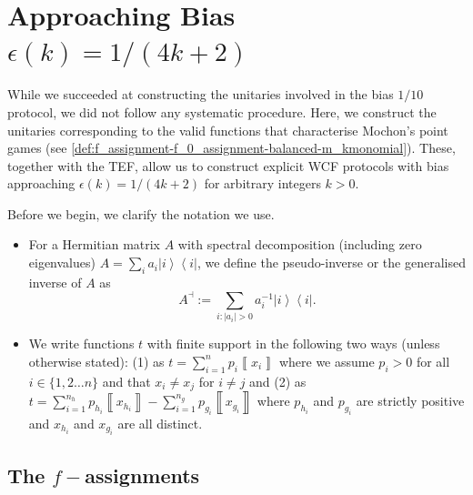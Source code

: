 \documentclass{theoretics}
\begin{document}
%
%
%
\section{Approaching Bias \texorpdfstring{$\epsilon(k)=1/(4k+2)$}{epsilon(k)=1/(4k+2)}} \label{sec:1by4k+2}

While we succeeded at constructing the unitaries involved in the bias
$1/10$ protocol, we did not follow any systematic procedure. Here,
we construct the unitaries corresponding to the valid functions that characterise  Mochon's  point games
(see \cref{def:f_assignment-f_0_assignment-balanced-m_kmonomial}).
%
These, together with the TEF, allow us to construct explicit WCF protocols with bias approaching $\epsilon(k)=1/(4k+2)$ for arbitrary integers
$k>0$.

%
Before we begin, we clarify the notation we use. %
%
%

\begin{itemize}
  \item For a Hermitian matrix $A$ with spectral decomposition (including zero eigenvalues) $A=\sum_{i}a_{i}\left|i\right\rangle \left\langle i\right|$, we define
        the pseudo-inverse or the generalised inverse of $A$ as $$A^{\dashv}:=\sum_{i:\left|a_{i}\right|>0}a_{i}^{-1}\left|i\right\rangle \left\langle i\right|.$$
  \item We write functions
        $t$ with finite support in the following two ways (unless otherwise stated): (1) as $t=\sum_{i=1}^{n}p_{i}\left\llbracket x_{i}\right\rrbracket $
        where we assume $p_{i}>0$ for all $i\in\{1,2\dots n\}$ and that
        $x_{i}\neq x_{j}$ for $i\neq j$ and (2) as $t=\sum_{i=1}^{n_{h}}p_{h_{i}}\left\llbracket x_{h_{i}}\right\rrbracket -\sum_{i=1}^{n_{g}}p_{g_{i}}\left\llbracket x_{g_{i}}\right\rrbracket $
        where $p_{h_{i}}$ and $p_{g_{i}}$ are strictly positive and $x_{h_{i}}$
        and $x_{g_{i}}$ are all distinct.

\end{itemize}

\subsection{The \texorpdfstring{$f-$}{f-}assignments}\label{subsec:fassignmentequivmonomial}
\end{document}
